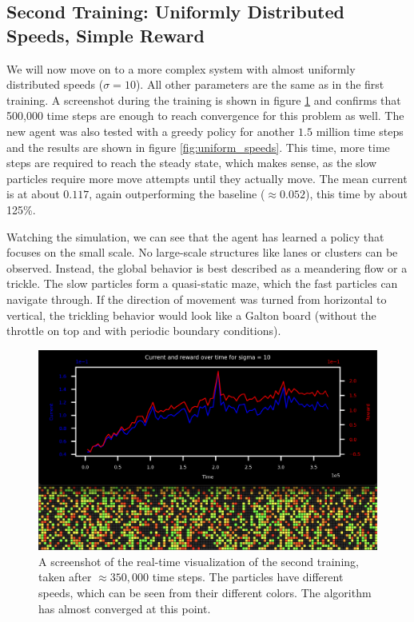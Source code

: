 \subsection{Second Training: Uniformly Distributed Speeds, Simple Reward}
\label{sec:second_training}
We will now move on to a more complex system with almost uniformly distributed speeds ($\sigma=10$). All other parameters are the same as in the first training. A screenshot during the training is shown in figure \ref{fig:second_training_screenshot} and confirms that 500,000 time steps are enough to reach convergence for this problem as well. The new agent was also tested with a greedy policy for another $1.5$ million time steps and the results are shown in figure \ref{fig:uniform_speeds}. This time, more time steps are required to reach the steady state, which makes sense, as the slow particles require more move attempts until they actually move. The mean current is at about $0.117$, again outperforming the baseline ($\approx 0.052$), this time by about 125\%. 


Watching the simulation, we can see that the agent has learned a policy that focuses on the small scale. No large-scale structures like lanes or clusters can be observed. Instead, the global behavior is best described as a meandering flow or a trickle. The slow particles form a quasi-static maze, which the fast particles can navigate through. If the direction of movement was turned from horizontal to vertical, the trickling behavior would look like a Galton board (without the throttle on top and with periodic boundary conditions).

\begin{figure}[h]
    \centering
    \includegraphics[width=\textwidth]{second_training_screenshot.png}
    \caption{A screenshot of the real-time visualization of the second training, taken after $\approx 350,000$ time steps. The particles have different speeds, which can be seen from their different colors. The algorithm has almost converged at this point.}
    \label{fig:second_training_screenshot}
\end{figure}

